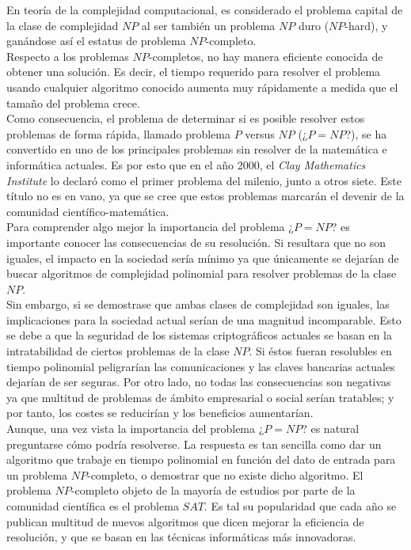 En teoría de la complejidad computacional, es considerado el problema capital de la clase de complejidad $NP$ al ser también un problema $NP$ duro ($NP$-hard), y ganándose así el estatus de problema $NP$-completo. \\

Respecto a los problemas $NP$-completos, no hay manera eficiente conocida de obtener una solución. Es decir, el tiempo requerido para resolver el problema usando cualquier algoritmo conocido aumenta muy rápidamente a medida que el tamaño del problema crece.\\

Como consecuencia, el problema de determinar si es posible resolver estos problemas de forma rápida, llamado problema $P$ versus $NP$ (¿$P=NP$?), se ha convertido en uno de los principales problemas sin resolver de la matemática e informática actuales. Es por esto que en el año 2000, el \textit{Clay Mathematics Institute} lo declaró como el primer problema del milenio, junto a otros siete. Este título no es en vano, ya que se cree que estos problemas marcarán el devenir de la comunidad científico-matemática.\\

Para comprender algo mejor la importancia del problema ¿$P=NP$? es importante conocer las consecuencias de su resolución. Si resultara que no son iguales, el impacto en la sociedad sería mínimo ya que únicamente se dejarían de buscar algoritmos de complejidad polinomial para resolver problemas de la clase $NP$.\\

Sin embargo, si se demostrase que ambas clases de complejidad son iguales, las implicaciones para la sociedad actual serían de una magnitud incomparable. Esto se debe a que la seguridad de los sistemas criptográficos actuales se basan en la intratabilidad de ciertos problemas de la clase $NP$. Si éstos fueran resolubles en tiempo polinomial peligrarían las comunicaciones y las claves bancarias actuales dejarían de ser seguras. Por otro lado, no todas las consecuencias son negativas ya que multitud de problemas de ámbito empresarial o social serían tratables; y por tanto, los costes se reducirían y los beneficios aumentarían.\\

Aunque, una vez vista la importancia del problema ¿$P=NP$? es natural preguntarse cómo podría resolverse. La respuesta es tan sencilla como dar un algoritmo que trabaje en tiempo polinomial en función del dato de entrada para un problema $NP$-completo, o demostrar que no existe dicho algoritmo. El problema $NP$-completo objeto de la mayoría de estudios por parte de la comunidad científica es el problema $SAT$. Es tal su popularidad que cada año se publican multitud de nuevos algoritmos que dicen mejorar la eficiencia de resolución, y que se basan en las técnicas informáticas más innovadoras. \\

